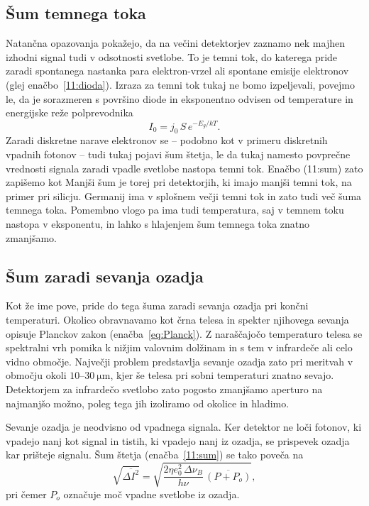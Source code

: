 \subsection*{Šum temnega toka} 
Natančna opazovanja pokažejo, da na večini detektorjev zaznamo nek majhen izhodni 
signal tudi v odsotnosti svetlobe. To je temni tok, do katerega pride zaradi
spontanega nastanka para elektron-vrzel ali spontane emisije elektronov 
(glej enačbo~\ref{11:dioda}). Izraza za temni tok tukaj ne bomo izpeljevali,
povejmo le, da je sorazmeren s površino diode in 
eksponentno odvisen od temperature in energijske reže polprevodnika 
\begin{equation}
I_0 = j_0\, S\, e^{-E_g/kT}.
\end{equation}
Zaradi diskretne narave elektronov se -- podobno
kot v primeru diskretnih vpadnih fotonov -- tudi tukaj pojavi šum štetja, le da tukaj 
namesto povprečne vrednosti signala zaradi vpadle svetlobe nastopa temni tok. 
Enačbo (11:sum) zato zapišemo kot 
Manjši šum je torej pri detektorjih, ki imajo manjši temni tok, na primer pri silicju. 
Germanij ima v splošnem večji temni tok in zato tudi več šuma temnega toka. Pomembno
vlogo pa ima tudi temperatura, saj v temnem toku nastopa v eksponentu, in lahko 
s hlajenjem šum temnega toka znatno zmanjšamo. 

\subsection*{Šum zaradi sevanja ozadja}
Kot že ime pove, pride do tega šuma zaradi sevanja ozadja pri končni temperaturi. 
Okolico obravnavamo kot črna telesa in spekter njihovega sevanja opisuje Planckov 
zakon (enačba~\ref{eq:Planck}). Z naraščajočo temperaturo telesa se 
spektralni vrh pomika k nižjim valovnim dolžinam in s tem v infrardeče ali celo 
vidno območje. Največji problem predstavlja sevanje ozadja zato pri meritvah v
območju okoli $10$--$30~\si{\micro\meter}$, kjer še telesa pri sobni temperaturi 
znatno sevajo. Detektorjem za infrardečo svetlobo zato pogosto zmanjšamo aperturo 
na najmanjšo možno, poleg tega jih izoliramo od okolice in hladimo. 

Sevanje ozadja je neodvisno od vpadnega signala. Ker detektor ne loči fotonov, ki 
vpadejo nanj kot signal in tistih, ki vpadejo nanj iz ozadja, se prispevek ozadja 
kar prišteje signalu. Šum štetja (enačba~\ref{11:sum}) se tako poveča na
\begin{equation}
\sqrt{\overline{\Delta I^2}} = \sqrt{\frac{2 \eta e_0^2\, \Delta\nu_B}{h\nu}\,
\overline{\left( P + P_o \right)}},
\label{11:ozadje}
\end{equation}
pri čemer $P_o$ označuje moč vpadne svetlobe iz ozadja.

